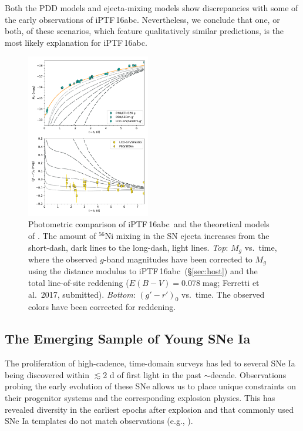 \documentclass[twocolumn]{aastex61}
\newcommand{\abc}{iPTF\,16abc}
\begin{document}
Both the PDD models and ejecta-mixing models show discrepancies with some of the early observations of \abc. Nevertheless, we conclude that one, or both, of these scenarios, which feature qualitatively similar predictions, is the most likely explanation for \abc. 

\begin{figure}[]
  \centering
  \includegraphics[width=0.48\textwidth]{iPTF16abc_Ni_lc.pdf}
  \caption{Photometric comparison of \abc\ and the theoretical 
  models of \citet{2016ApJ...826...96P}. The amount of $^{56}$Ni 
  mixing in the SN ejecta increases from the short-dash, dark lines 
  to the long-dash, light lines.
  \textit{Top}: $M_g$ vs.\ time, where the observed $g$-band 
  magnitudes  
  have been corrected to $M_g$ using the distance modulus to \abc\ 
  (\S\ref{sec:host})
  and the total line-of-site reddening ($E(B-V) = 0.078 \; 
  \mathrm{mag}$; Ferretti et al.\ 2017, submitted).
  \textit{Bottom}: $(g' - r')_0$ vs.\ time. The observed colors have 
  been corrected for reddening.
  }
  \label{fig:Ni56LC}
\end{figure}

\subsection{The Emerging Sample of Young SNe Ia}

The proliferation of high-cadence, time-domain surveys has led to several SNe Ia being discovered within $\lesssim$2 d of first light in the past $\sim$decade. Observations probing the early evolution of these SNe allows us to place unique constraints on their progenitor systems and the corresponding explosion physics. This has revealed diversity in the earliest epochs after explosion and that commonly used SNe Ia templates do not match observations (e.g., \citealt{2012ApJ...744...38F}).
\end{document}
